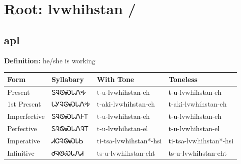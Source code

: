 \documentclass{article}%
\begin{document}
%
\normalsize%
\section*{Root: lvwhihstan / }%
\subsection*{apl}%
\textbf{Definition: }%
he/she is working%
\\[0.5em]%
\begin{tabular}{|l|l|l|l|}%
\hline%
\textbf{Form}&\textbf{Syllabary}&\textbf{With Tone}&\textbf{Toneless}\\%
\hline%
Present&ᏚᎸᏫᏍᏓᏁᎭ&t{-}u{-}lvwhihstan{-}eh&t{-}u{-}lvwhihstan{-}eh\\%
1st Present&ᏓᎩᎸᏫᏍᏓᏁᎭ&t{-}aki{-}lvwhihstan{-}eh&t{-}aki{-}lvwhihstan{-}eh\\%
Imperfective&ᏚᎸᏫᏍᏓᏁᎰᎢ&t{-}u{-}lvwhihstan{-}eh&t{-}u{-}lvwhihstan{-}eh\\%
Perfective&ᏚᎸᏫᏍᏓᏁᎸᎢ&t{-}u{-}lvwhihstan{-}el&t{-}u{-}lvwhihstan{-}el\\%
Imperative&ᏗᏣᎸᏫᏍᏓᏏ&ti{-}tsa{-}lvwhihstan*{-}hsi&ti{-}tsa{-}lvwhihstan*{-}hsi\\%
Infinitive&ᏧᎸᏫᏍᏓᏁᏗ&ts{-}u{-}lvwhihstan{-}eht&ts{-}u{-}lvwhihstan{-}eht\\%
\hline%
\end{tabular}%
\\[1em]%
\end{document}
